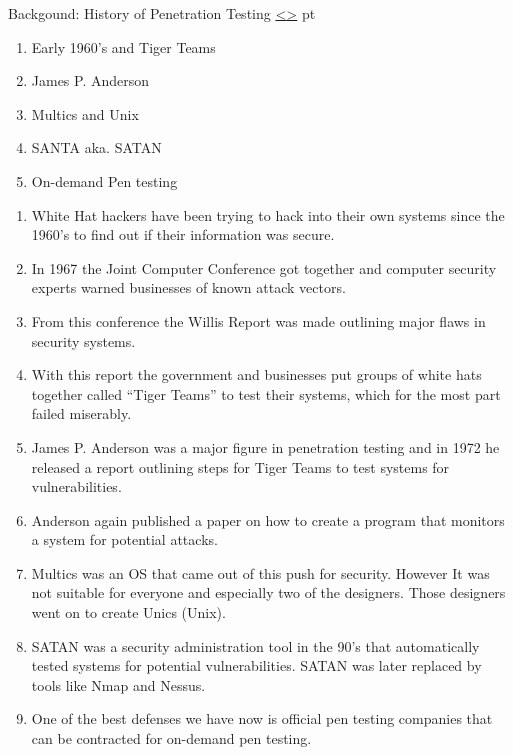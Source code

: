 \documentclass[12pt]{extarticle}
\newenvironment{instructionblock}{\Large\bgroup}{\egroup}
\newcounter{next}
\newcounter{prev}
\begin{document}
\pagebreak
{}
\begin{slide}{Backgound: History of Penetration Testing}
{\hyperref[slide \theprev]{\textless}\hyperref[slide \thenext]{\textgreater}}
	 pt
	\begin{instructionblock}
		\begin{enumerate}
			\item Early 1960's and Tiger Teams
            \item James P. Anderson
            \item Multics and Unix
            \item SANTA aka. SATAN
            \item On-demand Pen testing
		\end{enumerate}
	\end{instructionblock}
\end{slide}
\begin{enumerate}
	\item White Hat hackers have been trying to hack into their own systems since the 1960's to find out if their information was secure. \cite{Ref:Background1}
    \item In 1967 the Joint Computer Conference got together and computer security experts warned businesses of known attack vectors. \cite{Ref:Background1}
    \item From this conference the Willis Report was made outlining major flaws in security systems. \cite{Ref:Background1}
    \item With this report the government and businesses put groups of white hats together called ``Tiger Teams'' to test their systems, which for the most part failed miserably. \cite{Ref:Background1}
    \item James P. Anderson was a major figure in penetration testing and in 1972 he released a report outlining steps for Tiger Teams to test systems for vulnerabilities. \cite{Ref:Background1}
    \item Anderson again published a paper on how to create a program that monitors a system for potential attacks. \cite{Ref:Background1}
    \item Multics was an OS that came out of this push for security. However It was not suitable for everyone and especially two of the designers. Those designers went on to create Unics (Unix). \cite{Ref:Background1}
    \item SATAN was a security administration tool in the 90's that automatically tested systems for potential vulnerabilities. SATAN was later replaced by tools like Nmap and Nessus. \cite{Ref:Background1}
    \item One of the best defenses we have now is official pen testing companies that can be contracted for on-demand pen testing. \cite{Ref:Background1}
\end{enumerate}
\end{document}
